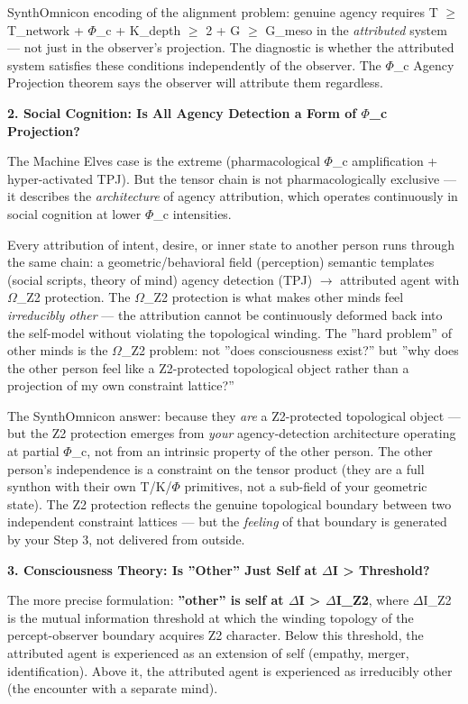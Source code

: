 \documentclass[12pt,a4paper]{article}
\begin{document}
SynthOmnicon encoding of the alignment problem: genuine agency requires T $\geq$ T\_network + $\Phi$\_c + K\_depth $\geq$ 2 + G $\geq$ G\_meso in the \emph{attributed} system --- not just in the observer's projection. The diagnostic is whether the attributed system satisfies these conditions independently of the observer. The $\Phi$\_c Agency Projection theorem says the observer will attribute them regardless.

\textbf{2. Social Cognition: Is All Agency Detection a Form of $\Phi$\_c Projection?}

The Machine Elves case is the extreme (pharmacological $\Phi$\_c amplification + hyper-activated TPJ). But the tensor chain is not pharmacologically exclusive --- it describes the \emph{architecture} of agency attribution, which operates continuously in social cognition at lower $\Phi$\_c intensities.

Every attribution of intent, desire, or inner state to another person runs through the same chain: a geometric/behavioral field (perception) \otimes semantic templates (social scripts, theory of mind) \otimes agency detection (TPJ) $\rightarrow$ attributed agent with $\Omega$\_Z2 protection. The $\Omega$\_Z2 protection is what makes other minds feel \emph{irreducibly other} --- the attribution cannot be continuously deformed back into the self-model without violating the topological winding. The ''hard problem'' of other minds is the $\Omega$\_Z2 problem: not ''does consciousness exist?'' but ''why does the other person feel like a Z2-protected topological object rather than a projection of my own constraint lattice?''

The SynthOmnicon answer: because they \emph{are} a Z2-protected topological object --- but the Z2 protection emerges from \emph{your} agency-detection architecture operating at partial $\Phi$\_c, not from an intrinsic property of the other person. The other person's independence is a constraint on the tensor product (they are a full synthon with their own T/K/$\Phi$ primitives, not a sub-field of your geometric state). The Z2 protection reflects the genuine topological boundary between two independent constraint lattices --- but the \emph{feeling} of that boundary is generated by your Step 3, not delivered from outside.

\textbf{3. Consciousness Theory: Is ''Other'' Just Self at $\Delta$I \textgreater{} Threshold?}

The more precise formulation: \textbf{''other'' is self at $\Delta$I \textgreater{} $\Delta$I\_Z2}, where $\Delta$I\_Z2 is the mutual information threshold at which the winding topology of the percept-observer boundary acquires Z2 character. Below this threshold, the attributed agent is experienced as an extension of self (empathy, merger, identification). Above it, the attributed agent is experienced as irreducibly other (the encounter with a separate mind).
\end{document}
